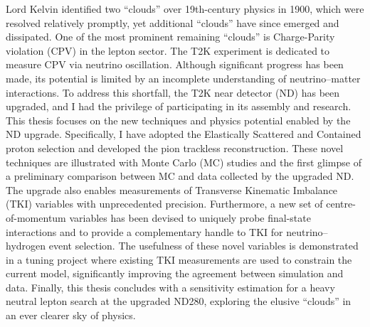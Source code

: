 Lord Kelvin identified two “clouds” over 19th-century physics in 1900, which were resolved relatively promptly, yet additional “clouds” have since emerged and dissipated.
One of the most prominent remaining ``clouds'' is Charge-Parity violation (CPV) in the lepton sector.
The T2K experiment is dedicated to measure CPV via neutrino oscillation.
Although significant progress has been made, its potential is limited by an incomplete understanding of neutrino–matter interactions.
To address this shortfall, the T2K near detector (ND) has been upgraded, and I had the privilege of participating in its assembly and research.
This thesis focuses on the new techniques and physics potential enabled by the ND upgrade.
Specifically, I have adopted the Elastically Scattered and Contained proton selection and developed the pion trackless reconstruction.
These novel techniques are illustrated with Monte Carlo (MC) studies and the first glimpse of a preliminary comparison between MC and data collected by the upgraded ND.
The upgrade also enables measurements of Transverse Kinematic Imbalance (TKI) variables with unprecedented precision. 
Furthermore, a new set of centre-of-momentum variables has been devised to uniquely probe final-state interactions and to provide a complementary handle to TKI for neutrino–hydrogen event selection.
The usefulness of these novel variables is demonstrated in a tuning project where existing TKI measurements are used to constrain the current model, significantly improving the agreement between simulation and data.
Finally, this thesis concludes with a sensitivity estimation for a heavy neutral lepton search at the upgraded ND280, exploring the elusive “clouds” in an ever clearer sky of physics.